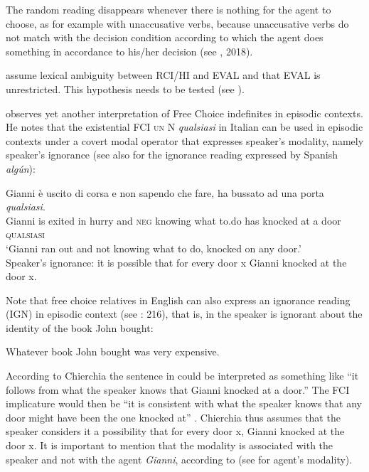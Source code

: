 The random reading disappears whenever there is nothing for the agent to choose, as for example with unaccusative verbs, because unaccusative verbs do not match with the decision condition according to which the agent does something in accordance to his/her decision (see \citealt{Alonso-OvalleMenéndez-Benito2011}, 2018).

\citet{am2018} assume lexical ambiguity between RCI/HI and EVAL and that EVAL is unrestricted. This hypothesis needs to be tested (see ).

\citet[574]{Chierchia2006} observes yet another interpretation of Free Choice indefinites in episodic contexts. He notes that the existential FCI \textsc{un} N \textit{qualsiasi} in Italian can be used in episodic contexts under a covert modal operator that expresses speaker’s modality, namely speaker’s ignorance (see also  for the ignorance reading expressed by Spanish \textit{algún}):

\ea %
\label{bkm:Ref533762757} 
\gll Gianni è uscito di corsa e non sapendo che fare, ha bussato ad una porta \textit{qualsiasi}.\\
Gianni is exited in hurry and \textsc{neg} knowing what to.do has knocked at a door \textsc{qualsiasi}\\ 

\glt ‘Gianni ran out and not knowing what to do, knocked on any door.’\\
Speaker’s ignorance: it is possible that for every door x Gianni knocked at the door x.
  \citep[574]{Chierchia2006}
\z

Note that free choice relatives in English can also express an ignorance reading (IGN) in episodic context (see \citealt{Condoravdi2015}: 216), that is, in  the speaker is ignorant about the identity of the book John bought:

\ea \label{ex:key:95} %
  Whatever book John bought was very expensive.
\z

According to Chierchia the sentence in  could be interpreted as something like “it follows from what the speaker knows that Gianni knocked at a door.” The FCI implicature would then be “it is consistent with what the speaker knows that any door might have been the one knocked at” \citep[574]{Chierchia2006}. Chierchia thus assumes that the speaker considers it a possibility that for every door x, Gianni knocked at the door x. It is important to mention that the modality is associated with the speaker and not with the agent \textit{Gianni}, according to \citet{Chierchia2006} (see  for agent’s modality).

